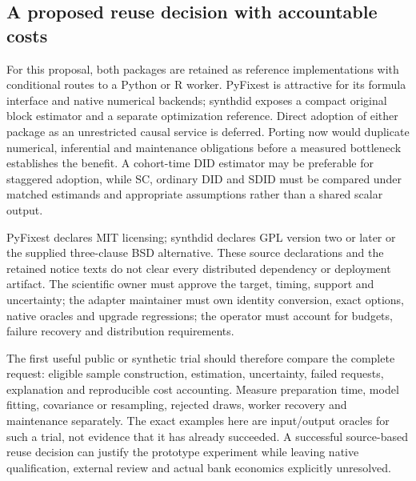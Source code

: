 \subsection{A proposed reuse decision with accountable costs}
\label{exec23:panel-reuse}
For this proposal, both packages are retained as reference implementations
with conditional routes to a Python or R worker. PyFixest is attractive for
its formula interface and native numerical backends; synthdid exposes a
compact original block estimator and a separate optimization reference.
Direct adoption of either package as an unrestricted causal service is
deferred. Porting now would duplicate numerical, inferential and maintenance
obligations before a measured bottleneck establishes the benefit. A
cohort-time DID estimator may be preferable for staggered adoption, while
SC, ordinary DID and SDID must be compared under matched estimands and
appropriate assumptions rather than a shared scalar output.
\citep{exec23_pyfixest_reuse_source,exec23_synthdid_reuse_source}

PyFixest declares MIT licensing; synthdid declares GPL version two or later
or the supplied three-clause BSD alternative. These source declarations and
the retained notice texts do not clear every distributed dependency or
deployment artifact. The scientific owner must approve the target, timing,
support and uncertainty; the adapter maintainer must own identity conversion,
exact options, native oracles and upgrade regressions; the operator must
account for budgets, failure recovery and distribution requirements.
\citep{exec23_pyfixest_reuse_source,exec23_synthdid_reuse_source}

The first useful public or synthetic trial should therefore compare the
complete request: eligible sample construction, estimation, uncertainty,
failed requests, explanation and reproducible cost accounting. Measure
preparation time, model fitting, covariance or resampling, rejected draws,
worker recovery and maintenance separately. The exact examples here are
input/output oracles for such a trial, not evidence that it has already
succeeded. A successful source-based reuse decision can justify the
prototype experiment while leaving native qualification, external review
and actual bank economics explicitly unresolved.
\citep{exec23_pyfixest_reference,exec23_synthdid_reference}

